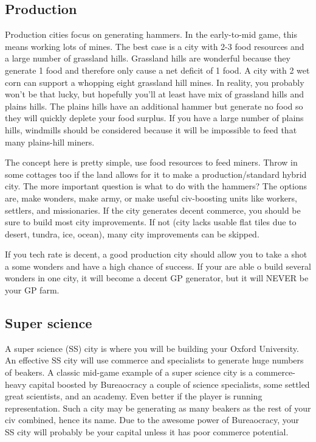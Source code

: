 \documentclass[10pt]{article}
\begin{document}
\subsection*{Production}

Production cities focus on generating hammers. In the early-to-mid game, this means
working lots of mines. The best case is a city with 2-3 food resources and a large
number of grassland hills. Grassland hills are wonderful because they generate 1 food
and therefore only cause a net deficit of 1 food. A city with 2 wet corn can support
a whopping eight grassland hill mines. In reality, you probably won't be that lucky,
but hopefully you'll at least have mix of grassland hills and plains hills. The plains
hills have an additional hammer but generate no food so they will quickly deplete
your food surplus. If you have a large number of plains hills, windmills should be
considered because it will be impossible to feed that many plains-hill miners.

The concept here is pretty simple, use food resources to feed miners. Throw in some
cottages too if the land allows for it to make a production/standard hybrid city.
The more important question is what to do with the hammers? The options are, make
wonders, make army, or make useful civ-boosting units like workers, settlers, and missionaries.
If the city generates decent commerce, you should be sure to
build most city improvements. If not (city lacks usable flat tiles due to desert,
tundra, ice, ocean), many city improvements can be skipped.

If you tech rate is decent, a good production city should allow you to take a shot
a some wonders and have a high chance of success. If your are able o build several
wonders in one city, it will become a decent GP generator, but it will NEVER be your
GP farm.

\subsection*{Super science}

A super science (SS) city is where you will be building your Oxford
University. An effective SS city will use commerce and specialists to
generate huge numbers of beakers. A classic mid-game example of a
super science city is a commerce-heavy capital boosted by Bureaocracy
a couple of science specialists, some settled great scientists, and an
academy. Even better if the player is running representation. Such a
city may be generating as many beakers as the rest of your civ
combined, hence its name. Due to the awesome power of Bureaocracy, your
SS city will probably be your capital unless it has poor commerce
potential.
\end{document}
